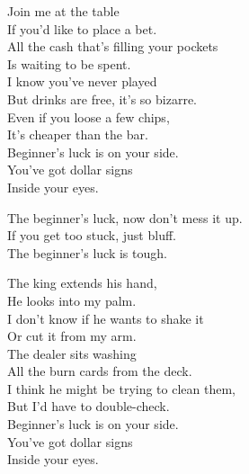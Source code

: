 
\label{album:gumboot-soup}





Join me at the table \\
If you'd like to place a bet. \\
All the cash that's filling your pockets \\
Is waiting to be spent. \\

I know you've never played \\
But drinks are free, it's so bizarre. \\
Even if you loose a few chips, \\
It's cheaper than the bar. \\

Beginner's luck is on your side. \\
You've got dollar signs \\
Inside your eyes. \\


The beginner's luck, now don't mess it up. \\
If you get too stuck, just bluff. \\
The beginner's luck is tough. \\


The king extends his hand, \\
He looks into my palm. \\
I don't know if he wants to shake it \\
Or cut it from my arm. \\

The dealer sits washing \\
All the burn cards from the deck. \\
I think he might be trying to clean them, \\
But I'd have to double-check. \\

Beginner's luck is on your side. \\
You've got dollar signs \\
Inside your eyes. \\

